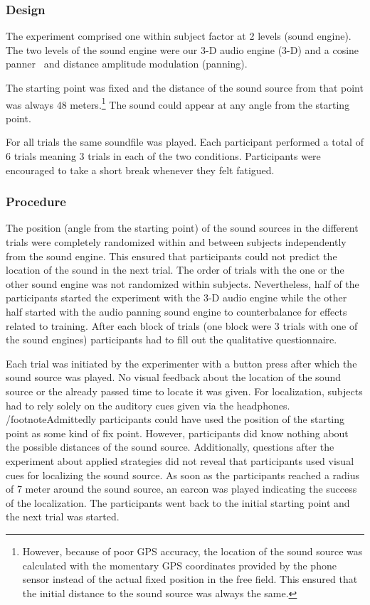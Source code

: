 \documentclass[journal]{IEEEtran}
\begin{document}
\subsubsection{Design}
The experiment comprised one within subject factor at 2 levels (sound engine). The two levels of the sound engine were our 3-D audio engine (3-D) and a cosine panner~\cite{AndyFarnell2010} and distance amplitude modulation (panning).

The starting point was fixed and the distance of the sound source from that point was always 48 meters.\footnote{However, because of poor GPS accuracy, the location of the sound source was calculated with the momentary GPS coordinates provided by the phone sensor instead of the actual fixed position in the free field. This ensured that the initial distance to the sound source was always the same.} The sound could appear at any angle from the starting point.

For all trials the same soundfile was played. Each participant performed a total of 6 trials meaning 3 trials in each of the two conditions. Participants were encouraged to take a short break whenever they felt fatigued.

\subsubsection{Procedure}
The position (angle from the starting point) of the sound sources in the different trials were completely randomized within and between subjects independently from the sound engine. This ensured that participants could not predict the location of the sound in the next trial. The order of trials with the one or the other sound engine was not randomized within subjects. Nevertheless, half of the participants started the experiment with the 3-D audio engine while the other half started with the audio panning sound engine to counterbalance for effects related to training. After each block of trials (one block were 3 trials with one of the sound engines) participants had to fill out the qualitative questionnaire.

Each trial was initiated by the experimenter with a button press after which the sound source was played. No visual feedback about the location of the sound source or the already passed time to locate it was given. For localization, subjects had to rely solely on the auditory cues given via the headphones. /footnote{Admittedly participants could have used the position of the starting point as some kind of fix point. However, participants did know nothing about the possible distances of the sound source. Additionally, questions after the experiment about applied strategies did not reveal that participants used visual cues for localizing the sound source.} As soon as the participants reached a radius of 7 meter around the sound source, an earcon was played indicating the success of the localization. The participants went back to the initial starting point and the next trial was started.
\end{document}

